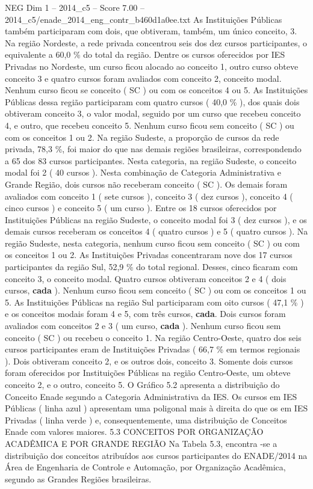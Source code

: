 \begin{textsample}{NEG Dim 1 – 2014\_c5 – Score 7.00 – 2014\_c5/enade\_2014\_eng\_contr\_b460d1a0ee.txt}
As Instituições Públicas também participaram com dois, que obtiveram, também, um único conceito, 3.
Na região Nordeste, a rede privada concentrou seis dos dez cursos participantes, o equivalente a 60,0 \% do total da região.
Dentre os cursos oferecidos por IES Privadas no Nordeste, um curso ficou alocado ao conceito 1, outro curso obteve conceito 3 e quatro cursos foram avaliados com conceito 2, conceito modal.
Nenhum curso ficou se conceito ( SC ) ou com os conceitos 4 ou 5.
As Instituições Públicas dessa região participaram com quatro cursos ( 40,0 \% ), dos quais dois obtiveram conceito 3, o valor modal, seguido por um curso que recebeu conceito 4, e outro, que recebeu conceito 5.
Nenhum curso ficou sem conceito ( SC ) ou com os conceitos 1 ou 2.
Na região Sudeste, a proporção de cursos da rede privada, 78,3 \%, foi maior do que nas demais regiões brasileiras, correspondendo a 65 dos 83 cursos participantes.
Nesta categoria, na região Sudeste, o conceito modal foi 2 ( 40 cursos ).
Nesta combinação de Categoria Administrativa e Grande Região, dois cursos não receberam conceito ( SC ).
Os demais foram avaliados com conceito 1 ( sete cursos ), conceito 3 ( dez cursos ), conceito 4 ( cinco cursos ) e conceito 5 ( um curso ).
Entre os 18 cursos oferecidos por Instituições Públicas na região Sudeste, o conceito modal foi 3 ( dez cursos ), e os demais cursos receberam os conceitos 4 ( quatro cursos ) e 5 ( quatro cursos ).
Na região Sudeste, nesta categoria, nenhum curso ficou sem conceito ( SC ) ou com os conceitos 1 ou 2.
As Instituições Privadas concentraram nove dos 17 cursos participantes da região Sul, 52,9 \% do total regional.
Desses, cinco ficaram com conceito 3, o conceito modal.
Quatro cursos obtiveram conceitos 2 e 4 ( dois cursos, \textbf{cada} ).
Nenhum curso ficou sem conceito ( SC ) ou com os conceitos 1 ou 5.
As Instituições Públicas na região Sul participaram com oito cursos ( 47,1 \% ) e os conceitos modais foram 4 e 5, com três cursos, \textbf{cada}.
Dois cursos foram avaliados com conceitos 2 e 3 ( um curso, \textbf{cada} ).
Nenhum curso ficou sem conceito ( SC ) ou recebeu o conceito 1.
Na região Centro-Oeste, quatro dos seis cursos participantes eram de Instituições Privadas ( 66,7 \% em termos regionais ).
Dois obtiveram conceito 2, e os outros dois, conceito 3.
Somente dois cursos foram oferecidos por Instituições Públicas na região Centro-Oeste, um obteve conceito 2, e o outro, conceito 5.
O Gráfico 5.2 apresenta a distribuição do Conceito Enade segundo a Categoria Administrativa da IES.
Os cursos em IES Públicas ( linha azul ) apresentam uma poligonal mais à direita do que os em IES Privadas ( linha verde ) e, consequentemente, uma distribuição de Conceitos Enade com valores maiores. 5.3 CONCEITOS POR ORGANIZAÇÃO ACADÊMICA E POR GRANDE REGIÃO Na Tabela 5.3, encontra -se a distribuição dos conceitos atribuídos aos cursos participantes do ENADE/2014 na Área de Engenharia de Controle e Automação, por Organização Acadêmica, segundo as Grandes Regiões brasileiras.

\end{textsample}
